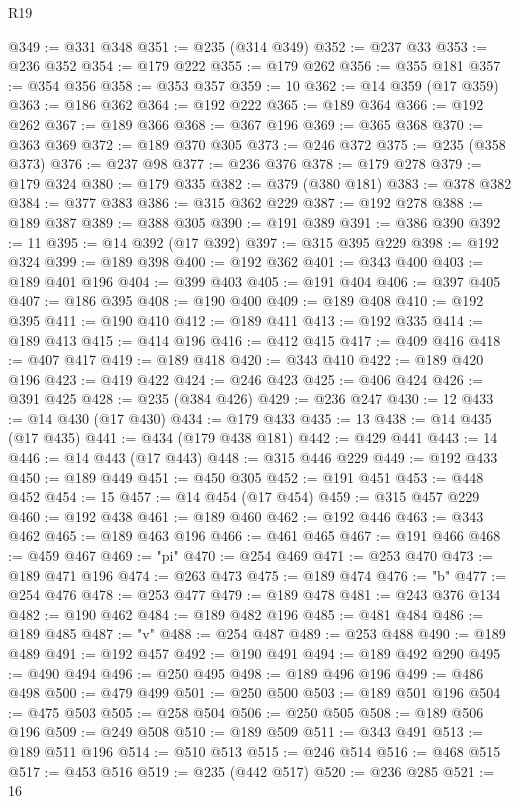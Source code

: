 \begin{lexlean}{R19}
\begin{coremodule}
@349 := @331 @348
@351 := @235 (@314 @349)
@352 := @237 @33
@353 := @236 @352
@354 := @179 @222
@355 := @179 @262
@356 := @355 @181
@357 := @354 @356
@358 := @353 @357
@359 := 10
@362 := @14 @359 (@17 @359)
@363 := @186 @362
@364 := @192 @222
@365 := @189 @364
@366 := @192 @262
@367 := @189 @366
@368 := @367 @196
@369 := @365 @368
@370 := @363 @369
@372 := @189 @370 @305
@373 := @246 @372
@375 := @235 (@358 @373)
@376 := @237 @98
@377 := @236 @376
@378 := @179 @278
@379 := @179 @324
@380 := @179 @335
@382 := @379 (@380 @181)
@383 := @378 @382
@384 := @377 @383
@386 := @315 @362 @229
@387 := @192 @278
@388 := @189 @387
@389 := @388 @305
@390 := @191 @389
@391 := @386 @390
@392 := 11
@395 := @14 @392 (@17 @392)
@397 := @315 @395 @229
@398 := @192 @324
@399 := @189 @398
@400 := @192 @362
@401 := @343 @400
@403 := @189 @401 @196
@404 := @399 @403
@405 := @191 @404
@406 := @397 @405
@407 := @186 @395
@408 := @190 @400
@409 := @189 @408
@410 := @192 @395
@411 := @190 @410
@412 := @189 @411
@413 := @192 @335
@414 := @189 @413
@415 := @414 @196
@416 := @412 @415
@417 := @409 @416
@418 := @407 @417
@419 := @189 @418
@420 := @343 @410
@422 := @189 @420 @196
@423 := @419 @422
@424 := @246 @423
@425 := @406 @424
@426 := @391 @425
@428 := @235 (@384 @426)
@429 := @236 @247
@430 := 12
@433 := @14 @430 (@17 @430)
@434 := @179 @433
@435 := 13
@438 := @14 @435 (@17 @435)
@441 := @434 (@179 @438 @181)
@442 := @429 @441
@443 := 14
@446 := @14 @443 (@17 @443)
@448 := @315 @446 @229
@449 := @192 @433
@450 := @189 @449
@451 := @450 @305
@452 := @191 @451
@453 := @448 @452
@454 := 15
@457 := @14 @454 (@17 @454)
@459 := @315 @457 @229
@460 := @192 @438
@461 := @189 @460
@462 := @192 @446
@463 := @343 @462
@465 := @189 @463 @196
@466 := @461 @465
@467 := @191 @466
@468 := @459 @467
@469 := "pi"
@470 := @254 @469
@471 := @253 @470
@473 := @189 @471 @196
@474 := @263 @473
@475 := @189 @474
@476 := "b"
@477 := @254 @476
@478 := @253 @477
@479 := @189 @478
@481 := @243 @376 @134
@482 := @190 @462
@484 := @189 @482 @196
@485 := @481 @484
@486 := @189 @485
@487 := "v"
@488 := @254 @487
@489 := @253 @488
@490 := @189 @489
@491 := @192 @457
@492 := @190 @491
@494 := @189 @492 @290
@495 := @490 @494
@496 := @250 @495
@498 := @189 @496 @196
@499 := @486 @498
@500 := @479 @499
@501 := @250 @500
@503 := @189 @501 @196
@504 := @475 @503
@505 := @258 @504
@506 := @250 @505
@508 := @189 @506 @196
@509 := @249 @508
@510 := @189 @509
@511 := @343 @491
@513 := @189 @511 @196
@514 := @510 @513
@515 := @246 @514
@516 := @468 @515
@517 := @453 @516
@519 := @235 (@442 @517)
@520 := @236 @285
@521 := 16

\end{coremodule}
\end{lexlean}
